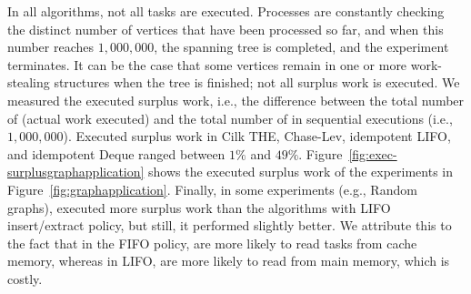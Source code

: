 In all algorithms, not all tasks are executed. Processes are constantly checking the distinct number of vertices that have been processed so far, and when this number reaches $1,000,000$, the spanning tree is completed, and the experiment terminates. It can be the case that some vertices remain in one or more work-stealing structures when the tree is finished; not all surplus work is executed. We measured the executed surplus work, i.e., the difference between the total number of \Takes (actual work executed) and the total number of \Takes in sequential executions (i.e., $1,000,000$). Executed surplus work in Cilk THE, Chase-Lev, idempotent LIFO, and idempotent Deque ranged between \(1\%\) and \(49\%\). Figure~\ref{fig:exec-surplusgraphapplication} shows the executed surplus work of the experiments in Figure~\ref{fig:graphapplication}. Finally, in some experiments (e.g., Random graphs), \NCWSM executed more surplus work than the algorithms with LIFO insert/extract policy, but still, it performed slightly better. We attribute this to the fact that in the FIFO policy, \Takes are more likely to read tasks from cache memory, whereas in LIFO, \Takes are more likely to read from main memory, which is costly.



